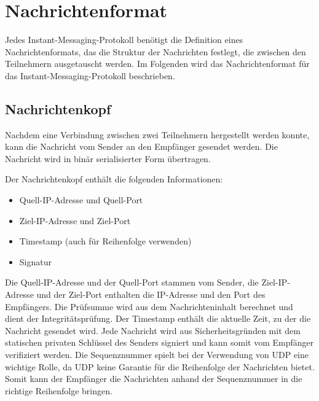 \section{Nachrichtenformat}
\label{sec:nachrichtenformat}


Jedes Instant-Messaging-Protokoll benötigt die Definition eines Nachrichtenformats, das die Struktur der Nachrichten festlegt, die zwischen den Teilnehmern ausgetauscht werden. Im Folgenden wird das Nachrichtenformat für das Instant-Messaging-Protokoll beschrieben.

\subsection{Nachrichtenkopf}

Nachdem eine Verbindung zwischen zwei Teilnehmern hergestellt werden konnte, kann die Nachricht vom Sender an den Empfänger gesendet werden. Die Nachricht wird in binär serialisierter Form übertragen. 


Der Nachrichtenkopf enthält die folgenden Informationen:

\begin{itemize}
    \item Quell-IP-Adresse und Quell-Port
    \item Ziel-IP-Adresse und Ziel-Port
    \item Timestamp (auch für Reihenfolge verwenden)
    \item Signatur
\end{itemize}

\noindent Die Quell-IP-Adresse und der Quell-Port stammen vom Sender, die Ziel-IP-Adresse und der Ziel-Port enthalten die IP-Adresse und den Port des Empfängers. Die Prüfsumme wird aus dem Nachrichteninhalt berechnet und dient der Integritätsprüfung. Der Timestamp enthält die aktuelle Zeit, zu der die Nachricht gesendet wird. Jede Nachricht wird aus Sicherheitsgründen mit dem statischen privaten Schlüssel des Senders signiert und kann somit vom Empfänger verifiziert werden. Die Sequenznummer spielt bei der Verwendung von UDP eine wichtige Rolle, da UDP keine Garantie für die Reihenfolge der Nachrichten bietet. Somit kann der Empfänger die Nachrichten anhand der Sequenznummer in die richtige Reihenfolge bringen.

